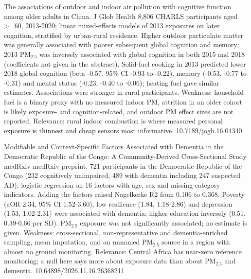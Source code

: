 \documentclass[10pt]{article}
\begin{document}
{The associations of outdoor and indoor air pollution with cognitive function among older adults in China.}
{J Glob Health}
{8,806 CHARLS participants aged >=60, 2013-2020; linear mixed-effects models of 2013 exposures on later cognition, stratified by urban-rural residence. Higher outdoor particulate matter was generally associated with poorer subsequent global cognition and memory; 2013 PM$_{2.5}$ was inversely associated with global cognition in both 2015 and 2018 (coefficients not given in the abstract). Solid-fuel cooking in 2013 predicted lower 2018 global cognition (beta -0.57, 95\% CI -0.93 to -0.22), memory (-0.53, -0.77 to -0.31) and mental status (-0.23, -0.40 to -0.06); heating fuel gave similar estimates. Associations were stronger in rural participants. Weakness: household fuel is a binary proxy with no measured indoor PM, attrition in an older cohort is likely exposure- and cognition-related, and outdoor PM effect sizes are not reported. Relevance: rural indoor combustion is where measured personal exposure is thinnest and cheap sensors most informative.}
{10.7189/jogh.16.04340}

{Modifiable and Context-Specific Factors Associated with Dementia in the Democratic Republic of the Congo: A Community-Derived Cross-Sectional Study}
{medRxiv}
{medRxiv preprint. 721 participants in the Democratic Republic of the Congo (232 cognitively unimpaired, 489 with dementia including 247 suspected AD); logistic regression on 16 factors with age, sex and missing-category indicators. Adding the factors raised Nagelkerke R2 from 0.106 to 0.368. Poverty (aOR 2.34, 95\% CI 1.52-3.60), low resilience (1.84, 1.18-2.86) and depression (1.53, 1.02-2.31) were associated with dementia; higher education inversely (0.51, 0.39-0.66 per SD). PM$_{2.5}$ exposure was not significantly associated; no estimate is given. Weakness: cross-sectional, non-representative and dementia-enriched sampling, mean imputation, and an unnamed PM$_{2.5}$ source in a region with almost no ground monitoring. Relevance: Central Africa has near-zero reference monitoring; a null here says more about exposure data than about PM$_{2.5}$ and dementia.}
{10.64898/2026.11.16.26368211}
\end{document}

